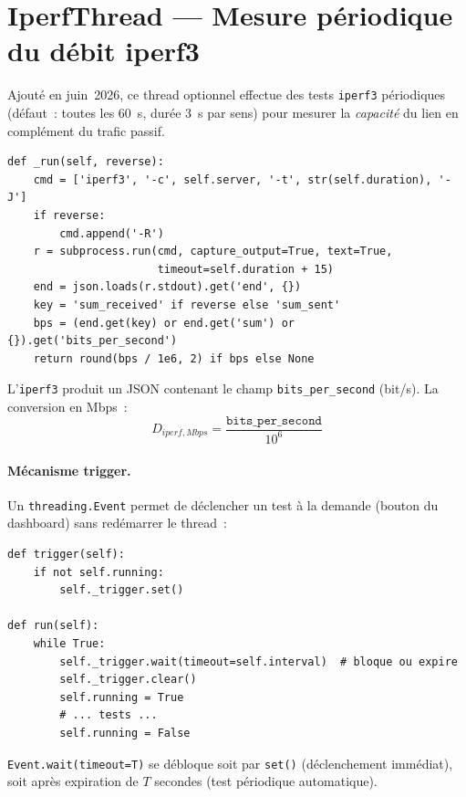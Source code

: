 \documentclass[a4paper,12pt]{article}
\begin{document}
\section{IperfThread — Mesure périodique du débit iperf3}

Ajouté en juin~2026, ce thread optionnel effectue des tests \texttt{iperf3} périodiques
(défaut~: toutes les 60~s, durée 3~s par sens) pour mesurer la \emph{capacité} du lien
en complément du trafic passif.

\begin{lstlisting}[caption={Cœur de la mesure iperf3}]
def _run(self, reverse):
    cmd = ['iperf3', '-c', self.server, '-t', str(self.duration), '-J']
    if reverse:
        cmd.append('-R')
    r = subprocess.run(cmd, capture_output=True, text=True,
                       timeout=self.duration + 15)
    end = json.loads(r.stdout).get('end', {})
    key = 'sum_received' if reverse else 'sum_sent'
    bps = (end.get(key) or end.get('sum') or {}).get('bits_per_second')
    return round(bps / 1e6, 2) if bps else None
\end{lstlisting}

L'\texttt{iperf3} produit un JSON contenant le champ \texttt{bits\_per\_second} (bit/s).
La conversion en Mbps~:
\begin{equation}
  \boxed{D_{iperf,Mbps} = \frac{\texttt{bits\_per\_second}}{10^6}}
\end{equation}

\paragraph{Mécanisme trigger.}
Un \texttt{threading.Event} permet de déclencher un test à la demande (bouton du
dashboard) sans redémarrer le thread~:

\begin{lstlisting}
def trigger(self):
    if not self.running:
        self._trigger.set()

def run(self):
    while True:
        self._trigger.wait(timeout=self.interval)  # bloque ou expire
        self._trigger.clear()
        self.running = True
        # ... tests ...
        self.running = False
\end{lstlisting}

\texttt{Event.wait(timeout=T)} se débloque soit par \texttt{set()} (déclenchement
immédiat), soit après expiration de $T$ secondes (test périodique automatique).
\end{document}
